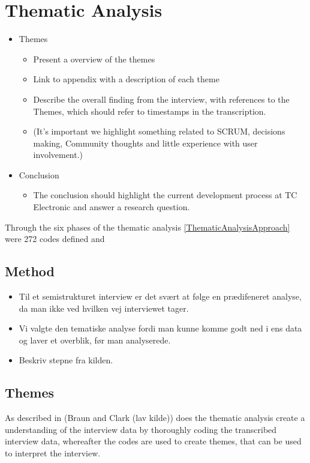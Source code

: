 \chapter{Thematic Analysis}
\label{ThemanticAnalysis}

\begin{itemize}
\item Themes
		\begin{itemize}
			\item Present a overview of the themes
			\item Link to appendix with a description of each theme
			\item Describe the overall finding from the interview, with references to the Themes, which should refer to timestamps in the transcription.
			\item (It’s important we highlight something related to SCRUM, decisions making, Community thoughts and little experience with user involvement.)
		\end{itemize}
	\item Conclusion
		\begin{itemize}
			\item The conclusion should highlight the current development process at TC Electronic and answer a research question.
		\end{itemize}
\end{itemize}


Through the six phases of the thematic analysis \autoref{ThematicAnalysisApproach} were 272 codes defined and 


\section{Method}
\label{ThematicMethod}

\begin{itemize}
	\item Til et semistrukturet interview er det svært at følge en prædifeneret analyse, da man ikke ved hvilken vej interviewet tager.
	\item Vi valgte den tematiske analyse fordi man kunne komme godt ned i ens data og laver et overblik, før man analyserede.
	\item Beskriv stepne fra kilden.
\end{itemize}

\section{Themes}
\label{ThematicThemes}
As described in (Braun and Clark (lav kilde)) does the thematic analysis create a understanding of the interview data by thoroughly coding the transcribed interview data, whereafter the codes are used to create themes, that can be used to interpret the interview. \\

